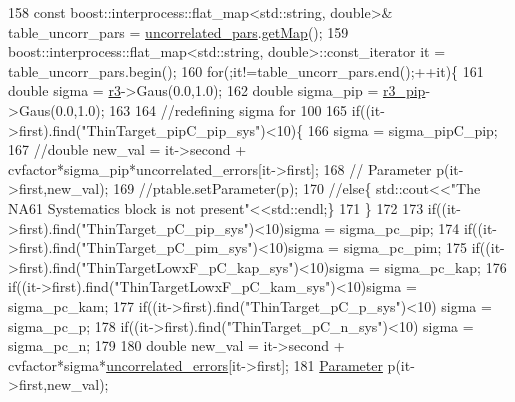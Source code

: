 \begin{DoxyCode}
{158     \textcolor{keyword}{const} boost::interprocess::flat\_map<std::string, double>& table\_uncorr\_pars = 
      \hyperlink{class_neutrino_flux_reweight_1_1_central_values_and_uncertainties_a63acf76ede3ceff854b857a85612144b}{uncorrelated\_pars}.\hyperlink{class_neutrino_flux_reweight_1_1_parameter_table_a5438f5f53449e8dc1a12dfff2b9d922f}{getMap}();
159     boost::interprocess::flat\_map<std::string, double>::const\_iterator it = table\_uncorr\_pars.begin();
160     \textcolor{keywordflow}{for}(;it!=table\_uncorr\_pars.end();++it)\{
161       \textcolor{keywordtype}{double} sigma = \hyperlink{class_neutrino_flux_reweight_1_1_central_values_and_uncertainties_a0eca6932a5ff05df3a216e8c36cbba6e}{r3}->Gaus(0.0,1.0);
162       \textcolor{keywordtype}{double} sigma\_pip = \hyperlink{class_neutrino_flux_reweight_1_1_central_values_and_uncertainties_a040a7398532acbccd50713e1736012bd}{r3\_pip}->Gaus(0.0,1.0);
163  
164      \textcolor{comment}{//redefining sigma for 100%
165       \textcolor{keywordflow}{if}((it->first).find(\textcolor{stringliteral}{"ThinTarget\_pipC\_pip\_sys"})<10)\{
166       sigma = sigma\_pipC\_pip;
167       \textcolor{comment}{//double new\_val = it->second  + cvfactor*sigma\_pip*uncorrelated\_errors[it->first];}
168      \textcolor{comment}{// Parameter p(it->first,new\_val);}
169       \textcolor{comment}{//ptable.setParameter(p);}
170       \textcolor{comment}{//else\{  std::cout<<"The NA61 Systematics block is not present"<<std::endl;\}}
171       \}
172       
173       \textcolor{keywordflow}{if}((it->first).find(\textcolor{stringliteral}{"ThinTarget\_pC\_pip\_sys"})<10)sigma = sigma\_pc\_pip;
174       \textcolor{keywordflow}{if}((it->first).find(\textcolor{stringliteral}{"ThinTarget\_pC\_pim\_sys"})<10)sigma = sigma\_pc\_pim;
175       \textcolor{keywordflow}{if}((it->first).find(\textcolor{stringliteral}{"ThinTargetLowxF\_pC\_kap\_sys"})<10)sigma = sigma\_pc\_kap;
176       \textcolor{keywordflow}{if}((it->first).find(\textcolor{stringliteral}{"ThinTargetLowxF\_pC\_kam\_sys"})<10)sigma = sigma\_pc\_kam;
177       \textcolor{keywordflow}{if}((it->first).find(\textcolor{stringliteral}{"ThinTarget\_pC\_p\_sys"})<10)  sigma = sigma\_pc\_p;
178       \textcolor{keywordflow}{if}((it->first).find(\textcolor{stringliteral}{"ThinTarget\_pC\_n\_sys"})<10)  sigma = sigma\_pc\_n;
179 
180       \textcolor{keywordtype}{double} new\_val = it->second  + cvfactor*sigma*\hyperlink{class_neutrino_flux_reweight_1_1_central_values_and_uncertainties_a0c8b32122be01f7f29117a17f5c43ad7}{uncorrelated\_errors}[it->first];
181       \hyperlink{namespace_neutrino_flux_reweight_aa1e1a244ea4addfb793b4e316e6c0a72}{Parameter} p(it->first,new\_val);
}}
\end{DoxyCode}
